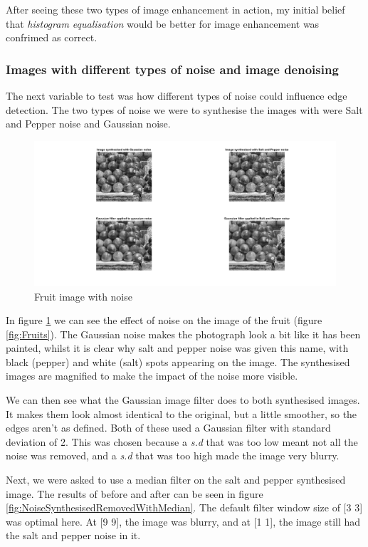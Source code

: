 \documentclass[11pt, letterpaper]{article}
\begin{document}
After seeing these two types of image enhancement in action, my initial belief that \textit{histogram equalisation} would be better for image enhancement was confrimed as correct.

\subsubsection*{Images with different types of noise and image denoising}
The next variable to test was how different types of noise could influence edge detection. The two types of noise we were to synthesise the images with were Salt and Pepper noise and Gaussian noise. 

\begin{figure}[ht]
    \centering
    \includegraphics[width=1\linewidth]{Lab 1/NoiseSynthesisedRemovedWithGauss.png}
    \caption{Fruit image with noise}
    \label{fig:NoiseSynthesisedRemovedWithGauss}
\end{figure}

In figure \ref{fig:NoiseSynthesisedRemovedWithGauss} we can see the effect of noise on the image of the fruit (figure \ref{fig:Fruits}). The Gaussian noise makes the photograph look a bit like it has been painted, whilst it is clear why salt and pepper noise was given this name, with black (pepper) and white (salt) spots appearing on the image. The synthesised images are magnified to make the impact of the noise more visible.

We can then see what the Gaussian image filter does to both synthesised images. It makes them look almost identical to the original, but a little smoother, so the edges aren't as defined. Both of these used a Gaussian filter with standard deviation of 2. This was chosen because a \textit{s.d} that was too low meant not all the noise was removed, and a \textit{s.d} that was too high made the image very blurry.

Next, we were asked to use a median filter on the salt and pepper synthesised image. The results of before and after can be seen in figure \ref{fig:NoiseSynthesisedRemovedWithMedian}. The default filter window size of [3 3] was optimal here. At [9 9], the image was blurry, and at [1 1], the image still had the salt and pepper noise in it. 
\end{document}
